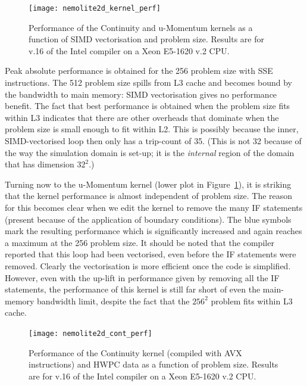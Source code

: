 \documentclass[12pt]{article}
\begin{document}
\begin{figure}
  \centering
  \texttt{[image: nemolite2d\_kernel\_perf]}
  \caption{Performance of the Continuity and u-Momentum kernels as a
    function of SIMD vectorisation and problem size. Results are for
    v.16 of the Intel compiler on a Xeon E5-1620 v.2 CPU.}
  \label{FIG_kernel_perf}
\end{figure}

Peak absolute performance is obtained for the 256 problem size with
SSE instructions. The 512 problem size spills from L3 cache and
becomes bound by the bandwidth to main memory: SIMD vectorisation
gives no performance benefit. The fact that best performance is
obtained when the problem size fits within L3 indicates that there are
other overheads that dominate when the problem size is small enough to
fit within L2. This is possibly because the inner, SIMD-vectorised
loop then only has a trip-count of 35. (This is not 32 because of the way
the simulation domain is set-up; it is the {\em internal} region of
the domain that has dimension $32^2$.)

Turning now to the u-Momentum kernel (lower plot in
Figure~\ref{FIG_kernel_perf}), it is striking that the kernel
performance is almost independent of problem size. The reason for this
becomes clear when we edit the kernel to remove the many IF statements
(present because of the application of boundary conditions). The blue
symbols mark the resulting performance which is significantly
increased and again reaches a maximum at the 256 problem size.  It
should be noted that the compiler reported that this loop had been
vectorised, even before the IF statements were removed. Clearly the
vectorisation is more efficient once the code is simplified. However,
even with the up-lift in performance given by removing all the IF
statements, the performance of this kernel is still far short of even
the main-memory bandwidth limit, despite the fact that the $256^2$
problem fits within L3 cache.

\begin{figure}
  \centering
  \texttt{[image: nemolite2d\_cont\_perf]}
  \caption{Performance of the Continuity kernel (compiled with AVX
    instructions) and HWPC data as a function of problem size. Results
    are for v.16 of the Intel compiler on a Xeon E5-1620 v.2 CPU.}
  \label{FIG_cont_perf}
\end{figure}
\end{document}
